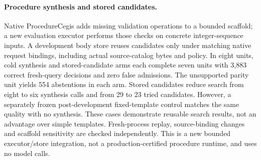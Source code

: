 \paragraph{Procedure synthesis and stored candidates.}
Native ProcedureCegis adds missing validation operations to a bounded scaffold;
a new evaluation executor performs those checks on concrete integer-sequence
inputs. A development body store reuses candidates only under matching native
request bindings, including actual source-catalog bytes and policy. In eight
units, cold synthesis and stored-candidate arms each complete seven units with
3,883 correct fresh-query decisions and zero false admissions. The unsupported
parity unit yields 554 abstentions in each arm. Stored candidates reduce search
from eight to six synthesis calls and from 29 to 23 tried candidates. However,
a separately frozen post-development fixed-template control matches the same
quality with no synthesis. These cases demonstrate reusable search results,
not an advantage over simple templates. Fresh-process replay, source-binding
changes and scaffold sensitivity are checked independently. This is a new
bounded executor/store integration, not a production-certified procedure
runtime, and uses no model calls.

